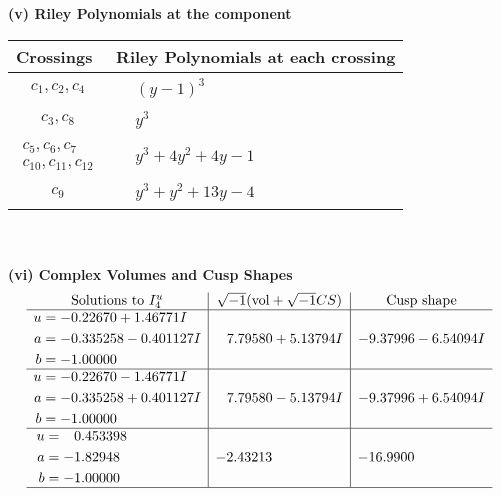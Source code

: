 \documentclass[1p]{elsarticle_modified}
\theoremstyle{definition}
\newcommand{\I}{\sqrt{-1}}
\begin{document}
\newpage\renewcommand{\arraystretch}{1}
\flushleft \textbf{(v) Riley Polynomials at the component}\newline \\
\begin{tabular}{m{50pt}|m{274pt}}
Crossings & \hspace{64pt}Riley Polynomials at each crossing \\
\hline $$\begin{aligned}c_{1},c_{2},c_{4}\end{aligned}$$&$\begin{aligned}
&(y-1)^3
\end{aligned}$\\
\hline $$\begin{aligned}c_{3},c_{8}\end{aligned}$$&$\begin{aligned}
&y^3
\end{aligned}$\\
\hline $$\begin{aligned}c_{5},c_{6},c_{7}\\c_{10},c_{11},c_{12}\end{aligned}$$&$\begin{aligned}
&y^3+4 y^2+4 y-1
\end{aligned}$\\
\hline $$\begin{aligned}c_{9}\end{aligned}$$&$\begin{aligned}
&y^3+y^2+13 y-4
\end{aligned}$\\
\hline
\end{tabular}\\~\\
\newpage\flushleft \textbf{(vi) Complex Volumes and Cusp Shapes}
$$\begin{array}{c|c|c}  
\text{Solutions to }I^u_{4}& \I (\text{vol} + \sqrt{-1}CS) & \text{Cusp shape}\\
 \hline 
\begin{aligned}
u &= -0.22670 + 1.46771 I \\
a &= -0.335258 - 0.401127 I \\
b &= -1.00000\phantom{ +0.000000I}\end{aligned}
 & \phantom{-}7.79580 + 5.13794 I & -9.37996 - 6.54094 I \\ \hline\begin{aligned}
u &= -0.22670 - 1.46771 I \\
a &= -0.335258 + 0.401127 I \\
b &= -1.00000\phantom{ +0.000000I}\end{aligned}
 & \phantom{-}7.79580 - 5.13794 I & -9.37996 + 6.54094 I \\ \hline\begin{aligned}
u &= \phantom{-}0.453398\phantom{ +0.000000I} \\
a &= -1.82948\phantom{ +0.000000I} \\
b &= -1.00000\phantom{ +0.000000I}\end{aligned}
 & -2.43213\phantom{ +0.000000I} & -16.9900\phantom{ +0.000000I}\\
 \hline 
 \end{array}$$\newpage\newpage\renewcommand{\arraystretch}{1}
\end{document}
